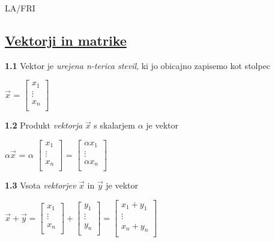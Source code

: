 \documentclass{article}
\begin{document}
\begin{center}
    {\small LA/FRI \par}
\end{center}

\begin{multicols}{4}

\section{\underline{Vektorji in matrike}}

\textbf{1.1} Vektor je \textit{urejena n-terica stevil}, ki jo obicajno
zapisemo kot stolpec\smallskip
\begin{center}
    $\vec{x}$ =
    $\begin{bmatrix}
        x_{1}\\
        \vdots \\
        x_{n}\\
    \end{bmatrix}$
\end{center}

\textbf{1.2} Produkt \textit{vektorja} $\vec{x}$ s skalarjem $\alpha$ je vektor
\begin{center}
    $\alpha \vec{x}$ =
    $\alpha$
    $\begin{bmatrix}
        x_{1}\\
        \vdots \\
        x_{n}\\
    \end{bmatrix}$ =
    $\begin{bmatrix}
        \alpha x_{1}\\
        \vdots \\
        \alpha x_{n}\\
    \end{bmatrix}$
\end{center}

\textbf{1.3} Vsota \textit{vektorjev} $\vec{x}$ in $\vec{y}$ je vektor
\begin{center}
    $\vec{x} + \vec{y} = 
    \begin{bmatrix}
        x_{1}\\
        \vdots \\
        x_{n}\\
    \end{bmatrix} +
    \begin{bmatrix}
        y_{1}\\
        \vdots \\
        y_{n}\\
    \end{bmatrix} =
    \begin{bmatrix}
        x_{1}  +  y_{1}\\
        \vdots\\
        x_{n} + y_{n}\\
    \end{bmatrix} 
    $
\end{center}


\end{multicols}
\end{document}
